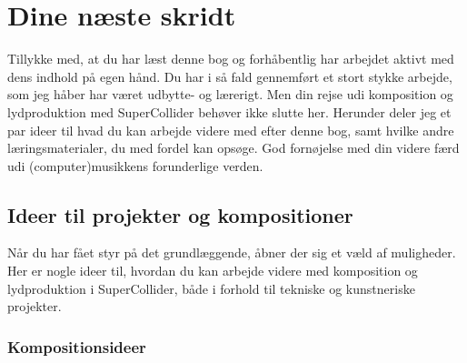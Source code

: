 \section{Dine næste skridt}

Tillykke med, at du har læst denne bog og forhåbentlig har arbejdet aktivt med dens indhold på egen hånd. Du har i så fald gennemført et stort stykke arbejde, som jeg håber har været udbytte- og lærerigt. Men din rejse udi komposition og lydproduktion med SuperCollider behøver ikke slutte her. Herunder deler jeg et par ideer til hvad du kan arbejde videre med efter denne bog, samt hvilke andre læringsmaterialer, du med fordel kan opsøge. God fornøjelse med din videre færd udi (computer)musikkens forunderlige verden.
\subsection{Ideer til projekter og kompositioner}

Når du har fået styr på det grundlæggende, åbner der sig et væld af muligheder. Her er nogle ideer til, hvordan du kan arbejde videre med komposition og lydproduktion i SuperCollider, både i forhold til tekniske og kunstneriske projekter.
\subsubsection{Kompositionsideer}


